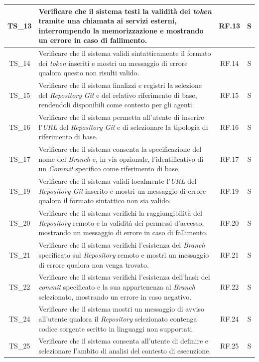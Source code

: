 \documentclass[12pt, a4paper]{article}
\newlength{\LargColVal} %
\begin{document}
\begin{xltabular}{\textwidth}{|c|X|C{\LargColVal}|C{\LargColVal}|}
    TS\_13 & Verificare che il sistema testi la validità dei \textit{token} tramite una chiamata ai servizi esterni, interrompendo la memorizzazione e mostrando un errore in caso di fallimento. & RF.13 & S \\ \hline
    TS\_14 & Verificare che il sistema validi sintatticamente il formato dei \textit{token} inseriti e mostri un messaggio di errore qualora questo non risulti valido. & RF.14 & S \\ \hline
    TS\_15 & Verificare che il sistema finalizzi e registri la selezione del \textit{Repository} \textit{Git} e del relativo riferimento di base, rendendoli disponibili come contesto per gli agenti. & RF.15 & S \\ \hline
    TS\_16 & Verificare che il sistema permetta all'utente di inserire l'\textit{URL} del \textit{Repository} \textit{Git} e di selezionare la tipologia di riferimento di base. & RF.16 & S \\ \hline
    TS\_17 & Verificare che il sistema consenta la specificazione del nome del \textit{Branch} e, in via opzionale, l'identificativo di un \textit{Commit} specifico come riferimento di base. & RF.17 & S \\ \hline
    TS\_19 & Verificare che il sistema validi localmente l'\textit{URL} del \textit{Repository Git} inserito e mostri un messaggio di errore qualora il formato sintattico non sia valido. & RF.19 & S \\ \hline
    TS\_20 & Verificare che il sistema verifichi la raggiungibilità del \textit{Repository} remoto e la validità dei permessi d'accesso, mostrando un messaggio di errore in caso di fallimento. & RF.20 & S \\ \hline
    TS\_21 & Verificare che il sistema verifichi l'esistenza del \textit{Branch} specificato sul \textit{Repository} remoto e mostri un messaggio di errore qualora non venga trovato. & RF.21 & S \\ \hline
    TS\_22 & Verificare che il sistema verifichi l'esistenza dell'hash del \textit{commit} specificato e la sua appartenenza al \textit{Branch} selezionato, mostrando un errore in caso negativo. & RF.22 & S \\ \hline
    TS\_24 & Verificare che il sistema mostri un messaggio di avviso all'utente qualora il \textit{Repository} selezionato contenga codice sorgente scritto in linguaggi non supportati. & RF.24 & S \\ \hline
    TS\_25 & Verificare che il sistema consenta all'utente di definire e selezionare l'ambito di analisi del contesto di esecuzione. & RF.25 & S \\ \hline

\end{xltabular}
\end{document}
